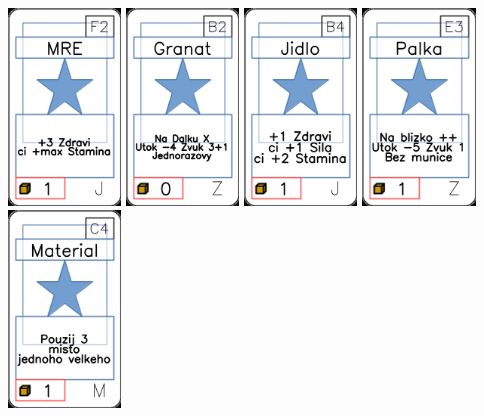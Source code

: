 \documentclass[a4paper]{article}
\begin{document}
	\includegraphics[width=3.0cm]{img-1_26}
	\includegraphics[width=3.0cm]{img-1_96}
	\includegraphics[width=3.0cm]{img-1_8}
	\includegraphics[width=3.0cm]{img-1_82}
	\includegraphics[width=3.0cm]{img-1_43}
\end{document}
